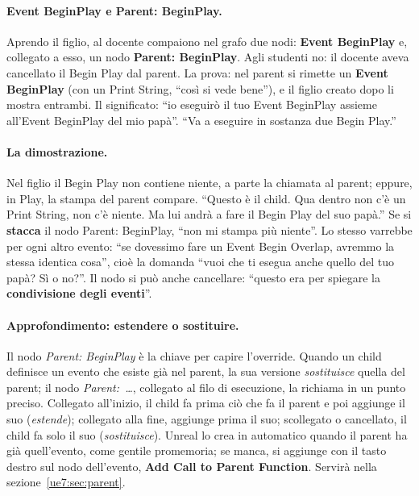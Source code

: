\paragraph{Event BeginPlay e Parent: BeginPlay.} Aprendo il figlio, al docente compaiono
nel grafo due nodi: \textbf{Event BeginPlay} e, collegato a esso, un nodo
\textbf{Parent: BeginPlay}. Agli studenti no: il docente aveva cancellato il Begin Play
dal parent. La prova: nel parent si rimette un \textbf{Event BeginPlay} (con un Print
String, ``così si vede bene''), e il figlio creato dopo li mostra entrambi. Il
significato: ``io eseguirò il tuo Event BeginPlay assieme all'Event BeginPlay del mio
papà''. ``Va a eseguire in sostanza due Begin Play.''

\paragraph{La dimostrazione.} Nel figlio il Begin Play non contiene niente, a parte la
chiamata al parent; eppure, in Play, la stampa del parent compare. ``Questo è il child.
Qua dentro non c'è un Print String, non c'è niente. Ma lui andrà a fare il Begin Play
del suo papà.'' Se si \textbf{stacca} il nodo Parent: BeginPlay, ``non mi stampa più
niente''. Lo stesso varrebbe per ogni altro evento: ``se dovessimo fare un Event Begin
Overlap, avremmo la stessa identica cosa'', cioè la domanda ``vuoi che ti esegua anche
quello del tuo papà? Sì o no?''. Il nodo si può anche cancellare: ``questo era per
spiegare la \textbf{condivisione degli eventi}''.

\paragraph{Approfondimento: estendere o sostituire.} Il nodo \emph{Parent: BeginPlay} è
la chiave per capire l'override. Quando un child definisce un evento che esiste già nel
parent, la sua versione \emph{sostituisce} quella del parent; il nodo
\emph{Parent:~\ldots}, collegato al filo di esecuzione, la richiama in un punto preciso.
Collegato all'inizio, il child fa prima ciò che fa il parent e poi aggiunge il suo
(\emph{estende}); collegato alla fine, aggiunge prima il suo; scollegato o cancellato, il
child fa solo il suo (\emph{sostituisce}). Unreal lo crea in automatico quando il parent
ha già quell'evento, come gentile promemoria; se manca, si aggiunge con il tasto destro
sul nodo dell'evento, \textbf{Add Call to Parent Function}. Servirà nella
sezione~\ref{ue7:sec:parent}.

